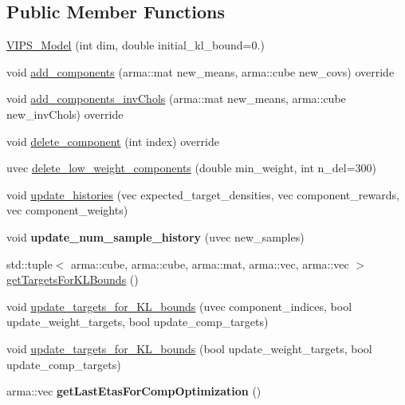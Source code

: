 \subsection*{Public Member Functions}
\begin{DoxyCompactItemize}
\item 
\hyperlink{classVIPS__Model_a7a17f89802a4e8be6ffefb92e691b602}{V\+I\+P\+S\+\_\+\+Model} (int dim, double initial\+\_\+kl\+\_\+bound=0.)
\item 
void \hyperlink{classVIPS__Model_afcc9485205fd0c61801546703bffa5eb}{add\+\_\+components} (arma\+::mat new\+\_\+means, arma\+::cube new\+\_\+covs) override
\item 
void \hyperlink{classVIPS__Model_ab83e56934a07a6381e0cb4f9beab26fd}{add\+\_\+components\+\_\+inv\+Chols} (arma\+::mat new\+\_\+means, arma\+::cube new\+\_\+inv\+Chols) override
\item 
void \hyperlink{classVIPS__Model_a6b0edde4a9a744639e1588cff6a5fa23}{delete\+\_\+component} (int index) override
\item 
uvec \hyperlink{classVIPS__Model_a6c65151f76ac7e9f5bbc79288b30986b}{delete\+\_\+low\+\_\+weight\+\_\+components} (double min\+\_\+weight, int n\+\_\+del=300)
\item 
void \hyperlink{classVIPS__Model_acf045c351edff854a5f520beb2723832}{update\+\_\+histories} (vec expected\+\_\+target\+\_\+densities, vec component\+\_\+rewards, vec component\+\_\+weights)
\item 
void {\bfseries update\+\_\+num\+\_\+sample\+\_\+history} (uvec new\+\_\+samples)\hypertarget{classVIPS__Model_a72e9125d30c8ce56e9e6bb71fd01a00e}{}\label{classVIPS__Model_a72e9125d30c8ce56e9e6bb71fd01a00e}

\item 
std\+::tuple$<$ arma\+::cube, arma\+::cube, arma\+::mat, arma\+::vec, arma\+::vec $>$ \hyperlink{classVIPS__Model_a19bd5e5c123088de22c80df818f67994}{get\+Targets\+For\+K\+L\+Bounds} ()
\item 
void \hyperlink{classVIPS__Model_a6a99261a47556afce9b21c456000e44c}{update\+\_\+targets\+\_\+for\+\_\+\+K\+L\+\_\+bounds} (uvec component\+\_\+indices, bool update\+\_\+weight\+\_\+targets, bool update\+\_\+comp\+\_\+targets)
\item 
void \hyperlink{classVIPS__Model_ab4c62ebc6e2bc4c2bbefe65d95a66b00}{update\+\_\+targets\+\_\+for\+\_\+\+K\+L\+\_\+bounds} (bool update\+\_\+weight\+\_\+targets, bool update\+\_\+comp\+\_\+targets)
\item 
arma\+::vec {\bfseries get\+Last\+Etas\+For\+Comp\+Optimization} ()\hypertarget{classVIPS__Model_a8906614c09de390b4a9437cadd54218f}{}\label{classVIPS__Model_a8906614c09de390b4a9437cadd54218f}


\end{DoxyCompactItemize}

